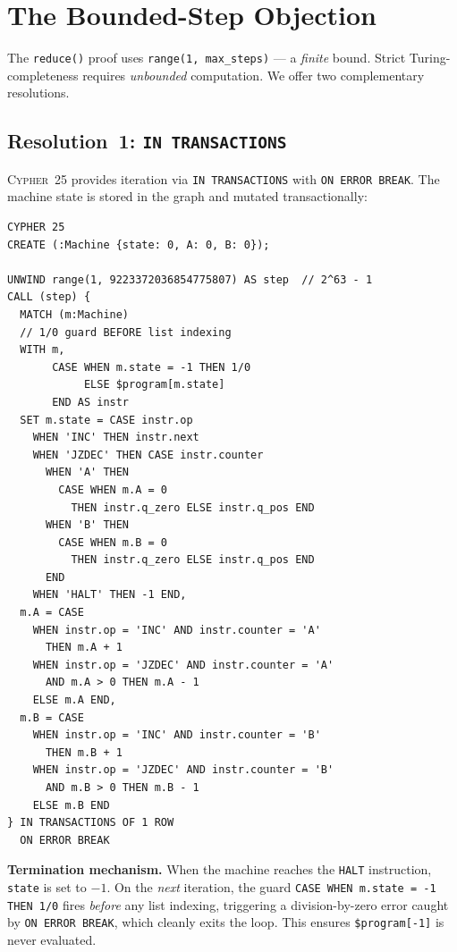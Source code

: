 \documentclass[11pt,a4paper]{article}
\begin{document}
\section{The Bounded-Step Objection}

The \texttt{reduce()} proof uses \texttt{range(1, max\_steps)} --- a
\emph{finite} bound. Strict Turing-completeness requires
\emph{unbounded} computation. We offer two complementary resolutions.

\subsection{Resolution~1: \texttt{IN TRANSACTIONS}}

\textsc{Cypher~25} provides iteration via \texttt{IN TRANSACTIONS} with
\texttt{ON ERROR BREAK}. The machine state is stored in the graph and
mutated transactionally:

\begin{codeblock}
\begin{lstlisting}
CYPHER 25
CREATE (:Machine {state: 0, A: 0, B: 0});

UNWIND range(1, 9223372036854775807) AS step  // 2^63 - 1
CALL (step) {
  MATCH (m:Machine)
  // 1/0 guard BEFORE list indexing
  WITH m,
       CASE WHEN m.state = -1 THEN 1/0
            ELSE $program[m.state]
       END AS instr
  SET m.state = CASE instr.op
    WHEN 'INC' THEN instr.next
    WHEN 'JZDEC' THEN CASE instr.counter
      WHEN 'A' THEN
        CASE WHEN m.A = 0
          THEN instr.q_zero ELSE instr.q_pos END
      WHEN 'B' THEN
        CASE WHEN m.B = 0
          THEN instr.q_zero ELSE instr.q_pos END
      END
    WHEN 'HALT' THEN -1 END,
  m.A = CASE
    WHEN instr.op = 'INC' AND instr.counter = 'A'
      THEN m.A + 1
    WHEN instr.op = 'JZDEC' AND instr.counter = 'A'
      AND m.A > 0 THEN m.A - 1
    ELSE m.A END,
  m.B = CASE
    WHEN instr.op = 'INC' AND instr.counter = 'B'
      THEN m.B + 1
    WHEN instr.op = 'JZDEC' AND instr.counter = 'B'
      AND m.B > 0 THEN m.B - 1
    ELSE m.B END
} IN TRANSACTIONS OF 1 ROW
  ON ERROR BREAK
\end{lstlisting}
\end{codeblock}

\textbf{Termination mechanism.}
When the machine reaches the \texttt{HALT} instruction, \texttt{state}
is set to $-1$. On the \emph{next} iteration, the guard
\texttt{CASE WHEN m.state = -1 THEN 1/0} fires \emph{before} any list
indexing, triggering a division-by-zero error caught by
\texttt{ON ERROR BREAK}, which cleanly exits the loop. This ensures
\texttt{\$program[-1]} is never evaluated.
\end{document}
